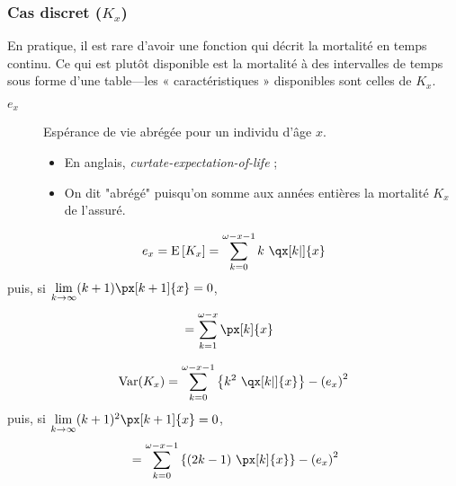 \documentclass[10pt, french]{article}
\begin{document}
\begin{multicols*}{3}
\columnbreak
\subsubsection{Cas discret ($K_{x}$)}
\begin{rappel_enhanced}[Contexte]
En pratique, il est rare d'avoir une fonction qui décrit la mortalité en temps continu. Ce qui est plutôt disponible est la mortalité à des intervalles de temps sous forme d'une table---les « caractéristiques » disponibles sont celles de $K_{x}$. 
\end{rappel_enhanced}


\begin{distributions}[Notation]
\begin{description}
	\item[$e_{x}$]	Espérance de vie abrégée pour un individu d'âge $x$.
		\begin{itemize}[leftmargin = *]
		\item	En anglais, \og \textit{curtate-expectation-of-life} \fg{};
		\item	On dit "abrégé" puisqu'on somme aux années entières la mortalité $K_{x}$ de l'assuré.
		\end{itemize}
\end{description}
\end{distributions}

\setlength{\mathindent}{-1cm}
\begin{definitionNOHFILLsub}
\begin{align*}
	e_{x}
	=	\esp{K_{x}}
	&=	\sum_{k = 0}^{\omega - x - 1} k \ \qx[k | ]{x}	\\
\end{align*}
puis, si $\limz{k}{\infty} (k + 1) \px[k + 1]{x} = 0$, 
\begin{align*}
	&=	\sum_{k = 1}^{\omega - x} \px[k]{x}
\end{align*}
\end{definitionNOHFILLsub}

\begin{definitionNOHFILLprop}[Variance]
\begin{align*}
	\text{Var}(K_{x}) 
	&=	\sum_{k = 0}^{\omega - x - 1}\left\{ k^{2} \ \qx[k | ]{x} \right\} - \left(e_{x}\right)^2	\\
\end{align*}
puis, si $\limz{k}{\infty} (k + 1)^{2} \px[k + 1]{x} = 0$, 
\begin{align*}
	&=	\sum_{k = 0}^{\omega - x - 1}\left\{ (2k - 1) \ \px[k]{x} \right\} - \left(e_{x}\right)^2	\\
\end{align*}
\setlength{\mathindent}{1cm}
\end{definitionNOHFILLprop}


\end{multicols*}
\end{document}
